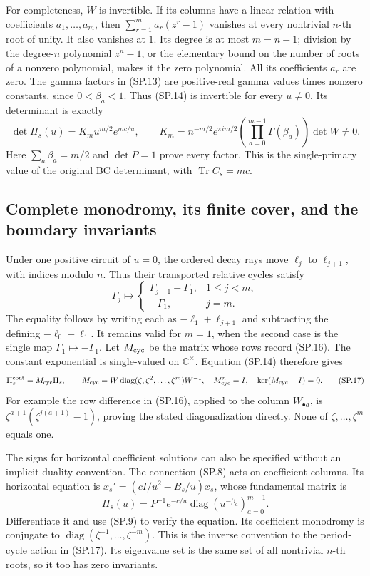 For completeness, \(W\) is invertible. If its columns have a
linear relation with coefficients \(a_1,\ldots,a_m\), then
\(\sum_{r=1}^m a_r(z^r-1)\) vanishes at every nontrivial
\(n\)-th root of unity. It also vanishes at \(1\).
Its degree is at most \(m=n-1\); division by the degree-\(n\)
polynomial \(z^n-1\), or the elementary bound on the number of
roots of a nonzero polynomial, makes it the zero polynomial.
All its coefficients \(a_r\) are zero.
The gamma factors in (SP.13) are positive-real gamma values
times nonzero constants, since \(0<\beta_a<1\).
Thus (SP.14) is invertible for every \(u\ne0\).
Its determinant is exactly
\[
 \det\Pi_s(u)
 =K_m u^{m/2}e^{mc/u},\qquad
 K_m=n^{-m/2}e^{\pi im/2}
       \left(\prod_{a=0}^{m-1}\Gamma(\beta_a)\right)\det W\ne0.
 \tag{SP.15}\label{eq:sp-det}
\]
Here \(\sum_a\beta_a=m/2\) and \(\det P=1\) prove every
factor. This is the single-primary value of the original BC
determinant, with \(\operatorname{Tr}C_s=mc\).

\subsection{Complete monodromy, its finite cover, and the boundary invariants}

Under one positive circuit of \(u=0\), the ordered decay rays
move \(\ell_j\) to \(\ell_{j+1}\), with indices modulo \(n\).
Thus their transported relative cycles satisfy
\[
 \Gamma_j\longmapsto
 \begin{cases}
  \Gamma_{j+1}-\Gamma_1,&1\le j<m,\\
  -\Gamma_1,&j=m.
 \end{cases}
 \tag{SP.16}\label{eq:sp-cyclemonodromy}
\]
The equality follows by writing each as
\(-\ell_1+\ell_{j+1}\) and subtracting the defining
\(-\ell_0+\ell_1\). It remains valid for \(m=1\), when
the second case is the single map \(\Gamma_1\mapsto-\Gamma_1\).
Let \(M_{\rm cyc}\) be the matrix whose rows record (SP.16).
The constant exponential is single-valued on \(\mathbb C^\times\).
Equation (SP.14) therefore gives
\[
 \Pi_s^{\rm cont}
 =M_{\rm cyc}\Pi_s,\qquad
 M_{\rm cyc}
 =W\operatorname{diag}(\zeta,\zeta^2,\ldots,\zeta^m)W^{-1},
 \quad M_{\rm cyc}^n=I,\quad
 \ker(M_{\rm cyc}-I)=0 .
 \tag{SP.17}\label{eq:sp-monodromy}
\]
For example the row difference in (SP.16), applied to the
column \(W_{\bullet a}\), is
\(\zeta^{a+1}(\zeta^{j(a+1)}-1)\), proving the stated
diagonalization directly. None of \(\zeta,\ldots,\zeta^m\)
equals one.

The signs for horizontal coefficient solutions can also be
specified without an implicit duality convention.
The connection (SP.8) acts on coefficient columns.
Its horizontal equation is
\(x_s'=(cI/u^2-B_s/u)x_s\), whose fundamental matrix is
\[
 H_s(u)=P^{-1}e^{-c/u}
           \operatorname{diag}(u^{-\beta_a})_{a=0}^{m-1}.
 \tag{SP.18}\label{eq:sp-horizontal}
\]
Differentiate it and use (SP.9) to verify the equation.
Its coefficient monodromy is conjugate to
\(\operatorname{diag}(\zeta^{-1},\ldots,\zeta^{-m})\).
This is the inverse convention to the period-cycle action
in (SP.17). Its eigenvalue set is the same set of all
nontrivial \(n\)-th roots, so it too has zero invariants.

